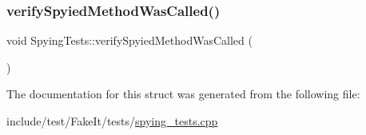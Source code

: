 \mbox{\label{structSpyingTests_a81a2b9751ad62818f62bd59109a358b9}} 
\subsubsection{\texorpdfstring{verifySpyiedMethodWasCalled()}{verifySpyiedMethodWasCalled()}}
{\footnotesize\ttfamily void Spying\+Tests\+::verify\+Spyied\+Method\+Was\+Called (\begin{DoxyParamCaption}{ }\end{DoxyParamCaption})\hspace{0.3cm}{\ttfamily [inline]}}



The documentation for this struct was generated from the following file\+:\begin{DoxyCompactItemize}
\item 
include/test/\+Fake\+It/tests/\mbox{\hyperlink{spying__tests_8cpp}{spying\+\_\+tests.\+cpp}}\end{DoxyCompactItemize}
